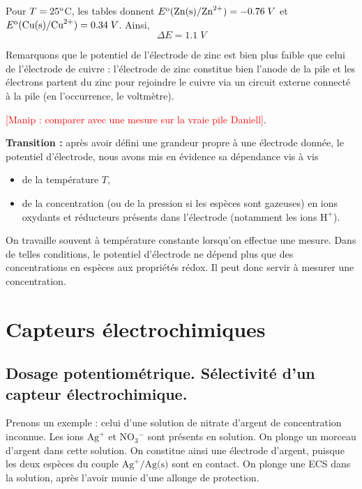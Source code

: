 \documentclass[11pt,a4paper]{report}
\begin{document}
Pour $T = 25\textsuperscript{o}$C, les tables donnent $E\textsuperscript{o}(\text{Zn}(\text{s})/\text{Zn}^{2+}) = -0.76\;V$ et $E\textsuperscript{o}(\text{Cu}(\text{s})/\text{Cu}^{2+}) = 0.34\;V$. Ainsi,
\begin{equation}
	\Delta E = 1.1\;V
\end{equation}

Remarquons que le potentiel de l'électrode de zinc est bien plus faible que celui de l'électrode de cuivre : l'électrode de zinc constitue bien l'anode de la pile et les électrons partent du zinc pour rejoindre le cuivre via un circuit externe connecté à la pile (en l'occurrence, le voltmètre).

\textcolor{red}{[Manip : comparer avec une mesure sur la vraie pile Daniell]}.

\newpage
\textbf{Transition :} après avoir défini une grandeur propre à une électrode donnée, le potentiel d'électrode, nous avons mis en évidence sa dépendance vis à vis
\begin{itemize}
	\item de la température $T$,
	\item de la concentration (ou de la pression si les espèces sont gazeuses) en ions oxydants et réducteurs présents dans l'électrode (notamment les ions $\text{H}^+$).\\
\end{itemize}

On travaille souvent à température constante lorsqu'on effectue une mesure. Dans de telles conditions, le potentiel d'électrode ne dépend plus que des concentrations en espèces aux propriétés rédox. Il peut donc servir à mesurer une concentration. 

\section{Capteurs électrochimiques}

\subsection{Dosage potentiométrique. Sélectivité d'un capteur électrochimique.}

Prenons un exemple : celui d'une solution de nitrate d'argent de concentration inconnue. Les ions $\text{Ag}^+$ et $\text{NO}_3{}^-$ sont présents en solution. On plonge un morceau d'argent dans cette solution. On constitue ainsi une électrode d'argent, puisque les deux espèces du couple $\text{Ag}^+/\text{Ag(s)}$ sont en contact. On plonge une ECS dans la solution, après l'avoir munie d'une allonge de protection.\\
\end{document}
